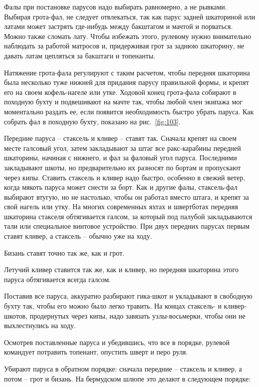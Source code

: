 \documentclass[a4paper, 12pt, twoside, final]{scrbook}
\begin{document}
Фалы при постановке парусов надо выбирать равномерно, а не рывками. Выбирая грота-фал, не следует отвлекаться, так как парус задней шкаториной или латами может застрять где-нибудь между бакштагом и мачтой и порваться. Можно также сломать лату. Чтобы избежать этого, рулевому нужно внимательно наблюдать за работой матросов и, придерживая грот за заднюю шкаторину, не давать латам цепляться за бакштаги и топенанты.

Натяжение грота-фала регулируют с таким расчетом, чтобы передняя шкаторина была несколько туже нижней для придания парусу правильной формы, и крепят его на своем кофель-нагеле или утке. Ходовой конец грота-фала собирают в походную бухту и подвешивают на мачте так, чтобы любой член экипажа мог моментально раздать ее, если появится необходимость быстро убрать паруса. Как собрать фал в походную бухту, показано на рис.~\ref{fig:103}.

Передние паруса \--- стаксель и кливер \--- ставят так. Сначала крепят на своем месте галсовый угол, затем закладывают за штаг все ракс-карабины передней шкаторины, начиная с нижнего, и фал за фаловый угол паруса. Последними закладывают шкоты, но предварительно их разносят по бортам и пропускают через кипы. Ставить стаксель и кливер надо быстро, особенно в свежий ветер, когда мякоть паруса может снести за борт. Как и другие фалы, стаксель-фал выбирают втугую, но не настолько, чтобы он работал вместо штага, и крепят за свой нагель или утку. На многих современных яхтах и швертботах передняя шкаторина стакселя обтягивается галсом, за который под палубой закладываются тали или специальное винтовое устройство. При двух передних парусах первым ставят кливер, а стаксель \--- обычно уже на ходу.

Бизань ставят точно так же, как и грот.

Летучий кливер ставится так же, как и кливер, но передняя шкаторина этого паруса обтягивается всегда галсом.

Поставив все паруса, аккуратно разбирают гика-шкот и укладывают в свободную бухту так, чтобы его можно было легко травить. На концах стаксель- и кливер-шкотов, продернутых через кипы, надо завязать узлы-восьмерки, чтобы они не выхлестнулись на ходу.

Осмотрев поставленные паруса и убедившись, что все в порядке, рулевой командует потравить топенант, опустить шверт и перо руля.

Убирают паруса в обратном порядке: сначала передние \--- стаксель и кливер, а потом \--- грот и бизань. На бермудском шлюпе это делают в следующем порядке:
\end{document}
